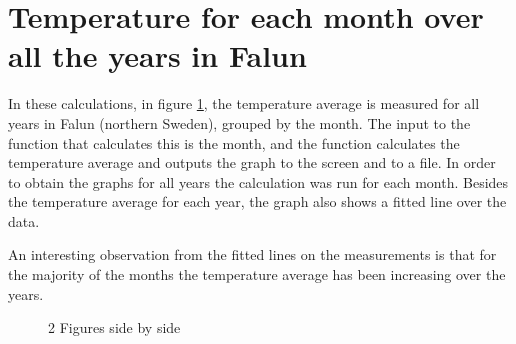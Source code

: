 \section{Temperature for each month over all the years in Falun}

In these calculations, in figure \ref{fig:measurements}, the temperature average
is measured for all years in Falun (northern Sweden), grouped by the month. The
input to the function that calculates this is the month, and the function
calculates the temperature average and outputs the graph to the screen and to a
file. In order to obtain the graphs for all years the calculation was run for
each month.  Besides the temperature average for each year, the graph also shows
a fitted line over the data.

An interesting observation from the fitted lines on the measurements is that
for the majority of the months the temperature average has been increasing over
the years.


\begin{figure}%
    \centering
    \noindent{}
    \noindent{}
    \caption{2 Figures side by side}%
    \label{fig:measurements}%
\end{figure}

